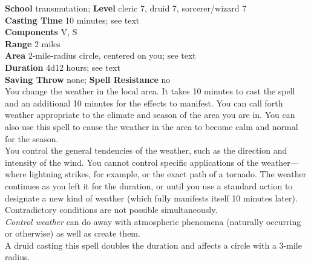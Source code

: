 \textbf{School} transmutation; \textbf{Level} cleric 7, druid 7, sorcerer/wizard 7\\
\textbf{Casting Time} 10 minutes; see text\\
\textbf{Components} V, S\\
\textbf{Range} 2 miles\\
\textbf{Area} 2-mile-radius circle, centered on you; see text\\
\textbf{Duration} 4d12 hours; see text\\
\textbf{Saving Throw} none; \textbf{Spell Resistance} no\\
You change the weather in the local area. It takes 10 minutes to cast the spell and an additional 10 minutes for the effects to manifest. You can call forth weather appropriate to the climate and season of the area you are in. You can also use this spell to cause the weather in the area to become calm and normal for the season.\\
You control the general tendencies of the weather, such as the direction and intensity of the wind. You cannot control specific applications of the weather---where lightning strikes, for example, or the exact path of a tornado. The weather continues as you left it for the duration, or until you use a standard action to designate a new kind of weather (which fully manifests itself 10 minutes later). Contradictory conditions are not possible simultaneously.\\
\textit{Control weather }can do away with atmospheric phenomena (naturally occurring or otherwise) as well as create them.\\
A druid casting this spell doubles the duration and affects a circle with a 3-mile radius.\\
